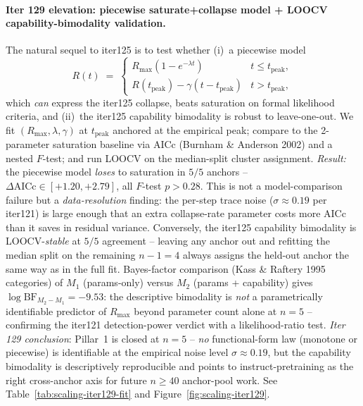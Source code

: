 \documentclass{article}
\begin{document}
\paragraph{Iter 129 elevation: piecewise saturate+collapse model + LOOCV capability-bimodality validation.}
\label{par:scaling-iter129}
The natural sequel to iter125 is to test whether (i)~a piecewise
model
\begin{equation}
  \label{eq:scaling-iter129-pw}
  R(t) \;=\; \begin{cases}
    R_{\max}(1 - e^{-\lambda t}) & t \le t_\mathrm{peak}, \\
    R(t_\mathrm{peak}) - \gamma(t - t_\mathrm{peak}) & t > t_\mathrm{peak},
  \end{cases}
\end{equation}
which \emph{can} express the iter125 collapse, beats saturation on
formal likelihood criteria, and (ii)~the iter125 capability
bimodality is robust to leave-one-out.  We fit
$(R_{\max}, \lambda, \gamma)$ at $t_\mathrm{peak}$ anchored at the
empirical peak; compare to the 2-parameter saturation baseline via
AICc (Burnham \& Anderson 2002) and a nested $F$-test; and run
LOOCV on the median-split cluster assignment.
\emph{Result:} the piecewise model \emph{loses} to saturation in
$5/5$ anchors -- $\Delta\text{AICc} \in [+1.20, +2.79]$, all
$F$-test $p > 0.28$.  This is not a model-comparison failure but
a \emph{data-resolution} finding: the per-step trace noise
($\sigma \approx 0.19$ per iter121) is large enough that an
extra collapse-rate parameter costs more AICc than it saves in
residual variance.  Conversely, the iter125 capability bimodality
is LOOCV-\emph{stable} at $5/5$ agreement -- leaving any anchor
out and refitting the median split on the remaining $n - 1 = 4$
always assigns the held-out anchor the same way as in the full
fit.  Bayes-factor comparison (Kass \& Raftery 1995 categories)
of $M_1$ (params-only) versus $M_2$ (params + capability) gives
$\log \mathrm{BF}_{M_2 - M_1} = -9.53$: the descriptive bimodality
is \emph{not} a parametrically identifiable predictor of $R_{\max}$
beyond parameter count alone at $n = 5$ -- confirming the iter121
detection-power verdict with a likelihood-ratio test.
\emph{Iter 129 conclusion}: Pillar~1 is closed at $n=5$ --
\emph{no} functional-form law (monotone or piecewise) is
identifiable at the empirical noise level $\sigma \approx 0.19$,
but the capability bimodality is descriptively reproducible and
points to instruct-pretraining as the right cross-anchor axis
for future $n \ge 40$ anchor-pool work.  See
Table~\ref{tab:scaling-iter129-fit} and
Figure~\ref{fig:scaling-iter129}.
\end{document}
